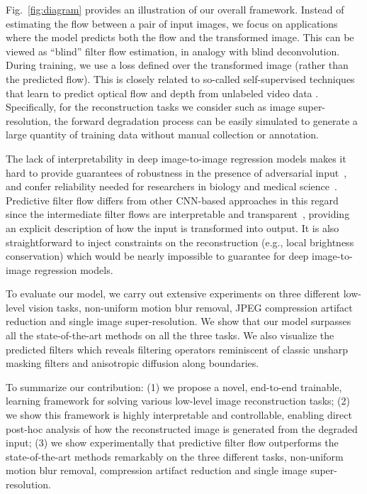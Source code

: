 \documentclass[10pt,twocolumn,letterpaper]{article}
\begin{document}
Fig.~\ref{fig:diagram} provides an illustration of our overall framework.
Instead of estimating the flow between a pair of input images, we focus on
applications where the model predicts both the flow and the transformed image.
This can be viewed as ``blind'' filter flow estimation, in analogy with blind
deconvolution.  During training, we use a loss defined over the transformed
image (rather than the predicted flow). This is closely related to so-called
self-supervised techniques that learn to predict optical flow and depth from
unlabeled video data \cite{garg2016unsupervised,godard2017unsupervised,jason2016back}.
Specifically, for the reconstruction tasks we
consider such as image super-resolution, the forward degradation process can be
easily simulated to generate a large quantity of training data without manual
collection or annotation.

The lack of interpretability in deep image-to-image regression models makes it
hard to provide guarantees of robustness in the presence of adversarial
input~\cite{kurakin2016adversarial}, and confer reliability needed for
researchers in biology and medical science~\cite{litjens2017survey}.
Predictive filter flow differs from other CNN-based approaches in this regard
since the intermediate filter flows are interpretable and
transparent~\cite{vellido2012making, doshi2017towards,Lipton18}, providing an
explicit description of how the input is transformed into output.  It is also
straightforward to inject constraints on the reconstruction (e.g., local
brightness conservation) which would be nearly impossible to guarantee for deep
image-to-image regression models.

To evaluate our model, we carry out extensive experiments on three different
low-level vision tasks, non-uniform motion blur removal, JPEG compression
artifact reduction and single image super-resolution.  We show that our model
surpasses all the state-of-the-art methods on all the three tasks. We also
visualize the predicted filters which reveals filtering operators reminiscent
of classic unsharp masking filters and anisotropic diffusion along boundaries.

To summarize our contribution: (1) we propose a novel, end-to-end
trainable, learning framework for solving various low-level image
reconstruction tasks;
(2) we show this framework is highly interpretable and controllable, enabling
direct post-hoc analysis of how the reconstructed image is generated from
the degraded input;
(3) we show experimentally that predictive filter flow outperforms the
state-of-the-art methods remarkably on the three different tasks, non-uniform
motion blur removal, compression artifact reduction and single image
super-resolution.
\end{document}

